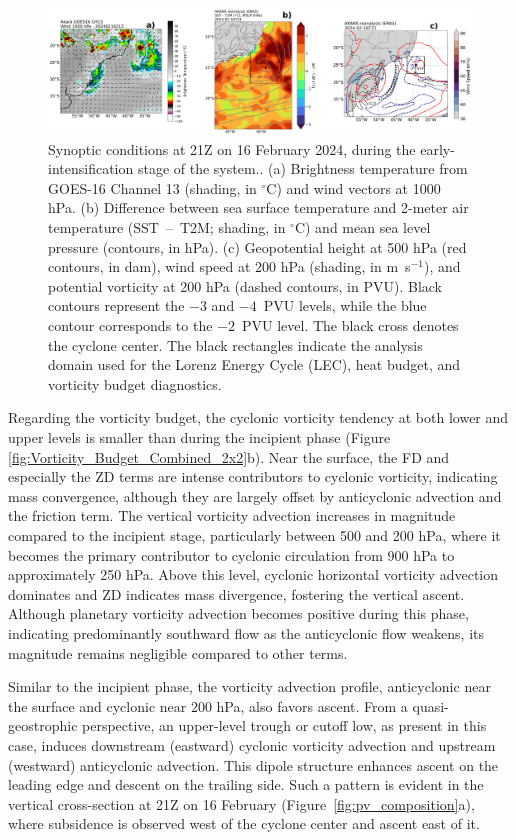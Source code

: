 \documentclass[pdflatex,sn-chicago]{sn-jnl}%
\theoremstyle{plain}
\theoremstyle{definition}
\theoremstyle{remark}
\theoremstyle{definition}
\begin{document}
\begin{figure}[h!]
\centering
\includegraphics[width=\textwidth]{composition_03.png}
\caption{Synoptic conditions at 21Z on 16 February 2024, during the early-intensification stage of the system.. (a) Brightness temperature from GOES-16 Channel 13 (shading, in $^{\circ}$C) and wind vectors at 1000 hPa. (b) Difference between sea surface temperature and 2-meter air temperature (SST~--~T2M; shading, in $^{\circ}$C) and mean sea level pressure (contours, in hPa). (c) Geopotential height at 500 hPa (red contours, in dam), wind speed at 200 hPa (shading, in m~s$^{-1}$), and potential vorticity at 200 hPa (dashed contours, in PVU). Black contours represent the $-3$ and $-4$~PVU levels, while the blue contour corresponds to the $-2$~PVU level. The black cross denotes the cyclone center. The black rectangles indicate the analysis domain used for the Lorenz Energy Cycle (LEC), heat budget, and vorticity budget diagnostics.}
\label{fig:composition_03}
\end{figure}

Regarding the vorticity budget, the cyclonic vorticity tendency at both lower and upper levels is smaller than during the incipient phase (Figure \ref{fig:Vorticity_Budget_Combined_2x2}b). Near the surface, the FD and especially the ZD terms are intense contributors to cyclonic vorticity, indicating mass convergence, although they are largely offset by anticyclonic advection and the friction term. The vertical vorticity advection increases in magnitude compared to the incipient stage, particularly between 500 and 200 hPa, where it becomes the primary contributor to cyclonic circulation from 900 hPa to approximately 250 hPa. Above this level, cyclonic horizontal vorticity advection dominates and ZD indicates mass divergence, fostering the vertical ascent. Although planetary vorticity advection becomes positive during this phase, indicating predominantly southward flow as the anticyclonic flow weakens, its magnitude remains negligible compared to other terms.

Similar to the incipient phase, the vorticity advection profile, anticyclonic near the surface and cyclonic near 200 hPa, also favors ascent. From a quasi-geostrophic perspective, an upper-level trough or cutoff low, as present in this case, induces downstream (eastward) cyclonic vorticity advection and upstream (westward) anticyclonic advection. This dipole structure enhances ascent on the leading edge and descent on the trailing side. Such a pattern is evident in the vertical cross-section at 21Z on 16 February (Figure~\ref{fig:pv_composition}a), where subsidence is observed west of the cyclone center and ascent east of it.
\end{document}
